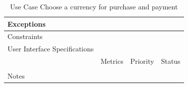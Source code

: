 \begin{table}[H]
\begin{tabularx}{\linewidth}{|l|X|X|X|}
            \hline Exceptions                    & \multicolumn{3}{l|}{}                                                                                 \\

            \hline Constraints                   & \multicolumn{3}{l|}{}                                                                                 \\

            \hline User Interface Specifications & \multicolumn{3}{l|}{}                                                                                 \\

            \hline \multirow{2}{*}{}             & Metrics                                                                           & Priority & Status \\
            \cline{2-4}                          &                                                                                   &          &        \\
            \hline Notes                         & \multicolumn{3}{l|}{}                                                                                 \\
            \hline
      \end{tabularx}
      \caption{Use Case Choose a currency for purchase and payment}
      \label{tab:use_case_choose_a_currency_for_purchase_and_payment}
\end{table}

